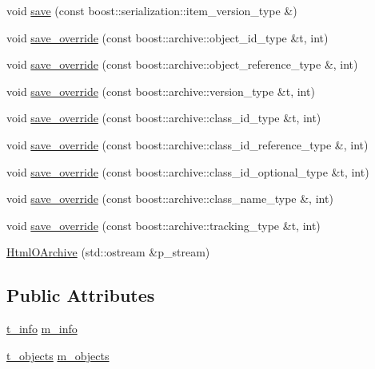 \begin{DoxyCompactItemize}
\item 
void \hyperlink{classxtd_1_1servers_1_1app_1_1HtmlOArchive_afae32c6090882adc5a310a9ba9297c12}{save} (const boost\+::serialization\+::item\+\_\+version\+\_\+type \&)
\item 
void \hyperlink{classxtd_1_1servers_1_1app_1_1HtmlOArchive_a0cd8f9056f209afd354f74073436b70e}{save\+\_\+override} (const boost\+::archive\+::object\+\_\+id\+\_\+type \&t, int)
\item 
void \hyperlink{classxtd_1_1servers_1_1app_1_1HtmlOArchive_add8049c6091432811543e5288706c3c9}{save\+\_\+override} (const boost\+::archive\+::object\+\_\+reference\+\_\+type \&, int)
\item 
void \hyperlink{classxtd_1_1servers_1_1app_1_1HtmlOArchive_a1afeaad47abf3aff1f91b5faa94f869b}{save\+\_\+override} (const boost\+::archive\+::version\+\_\+type \&t, int)
\item 
void \hyperlink{classxtd_1_1servers_1_1app_1_1HtmlOArchive_adbb73e26344036aa3c370bd1a133bf70}{save\+\_\+override} (const boost\+::archive\+::class\+\_\+id\+\_\+type \&t, int)
\item 
void \hyperlink{classxtd_1_1servers_1_1app_1_1HtmlOArchive_aa2bce7ac03f460426a47e25463212908}{save\+\_\+override} (const boost\+::archive\+::class\+\_\+id\+\_\+reference\+\_\+type \&, int)
\item 
void \hyperlink{classxtd_1_1servers_1_1app_1_1HtmlOArchive_a10cb86717b8b49afd68e5b6120662ce9}{save\+\_\+override} (const boost\+::archive\+::class\+\_\+id\+\_\+optional\+\_\+type \&t, int)
\item 
void \hyperlink{classxtd_1_1servers_1_1app_1_1HtmlOArchive_a3238b152ed11274e09c1b0c5995b62c6}{save\+\_\+override} (const boost\+::archive\+::class\+\_\+name\+\_\+type \&, int)
\item 
void \hyperlink{classxtd_1_1servers_1_1app_1_1HtmlOArchive_a62245e0fd68d61841e8e8f34922e5588}{save\+\_\+override} (const boost\+::archive\+::tracking\+\_\+type \&t, int)
\item 
\hyperlink{classxtd_1_1servers_1_1app_1_1HtmlOArchive_a7bf5587951c58ae1652bb73143e41fbc}{Html\+O\+Archive} (std\+::ostream \&p\+\_\+stream)
\end{DoxyCompactItemize}
\subsection*{Public Attributes}
\begin{DoxyCompactItemize}
\item 
\hyperlink{classxtd_1_1servers_1_1app_1_1HtmlOArchive_aedb461454d0c255709664fcccc379cf5}{t\+\_\+info} \hyperlink{classxtd_1_1servers_1_1app_1_1HtmlOArchive_a03bd854507f8457a3b5b575203108ff7}{m\+\_\+info}
\item 
\hyperlink{classxtd_1_1servers_1_1app_1_1HtmlOArchive_a0409a4336819121b7ec0d402ffca9cdf}{t\+\_\+objects} \hyperlink{classxtd_1_1servers_1_1app_1_1HtmlOArchive_a69e333ff9b2b0743e14976cfa4afd6d2}{m\+\_\+objects}
\end{DoxyCompactItemize}
